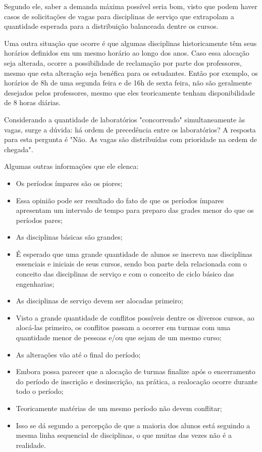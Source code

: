 Segundo ele, saber a demanda máxima possível seria bom, visto que podem haver casos de solicitações de vagas para disciplinas de serviço que extrapolam a quantidade esperada para a distribuição balanceada dentre os cursos.

Uma outra situação que ocorre é que algumas disciplinas historicamente têm seus horários definidos em um mesmo horário ao longo dos anos. Caso essa alocação seja alterada, ocorre a possibilidade de reclamação por parte dos professores, mesmo que esta alteração seja benéfica para os estudantes. Então por exemplo, os horários de 8h de uma segunda feira e de 16h de sexta feira, não são geralmente desejados pelos professores, mesmo que eles teoricamente tenham disponibilidade de 8 horas diárias.

Considerando a quantidade de laboratórios "concorrendo" simultaneamente às vagas, surge a dúvida: há ordem de precedência entre os laboratórios? A resposta para esta pergunta é "Não. As vagas são distribuídas com prioridade na ordem de chegada".

Algumas outras informações que ele elenca:

\begin{itemize}
  \item Os períodos ímpares são os piores;
  \item Essa opinião pode ser resultado do fato de que os períodos ímpares apresentam um intervalo de tempo para preparo das grades menor do que os períodos pares;
  \item As disciplinas básicas são grandes;
  \item É esperado que uma grande quantidade de alunos se inscreva nas disciplinas essenciais e iniciais de seus cursos, sendo boa parte dela relacionada com o conceito das disciplinas de serviço e com o conceito de ciclo básico das engenharias;
  \item As disciplinas de serviço devem ser alocadas primeiro;
  \item Visto a grande quantidade de conflitos possíveis dentre os diversos cursos, ao alocá-las primeiro, os conflitos passam a ocorrer em turmas com uma quantidade menor de pessoas e/ou que sejam de um mesmo curso;
  \item As alterações vão até o final do período;
  \item Embora possa parecer que a alocação de turmas finalize após o encerramento do período de inscrição e desinscrição, na prática, a realocação ocorre durante todo o período;
  \item Teoricamente matérias de um mesmo período não devem conflitar;
  \item Isso se dá segundo a percepção de que a maioria dos alunos está seguindo a mesma linha sequencial de disciplinas, o que muitas das vezes não é a realidade.
\end{itemize}

